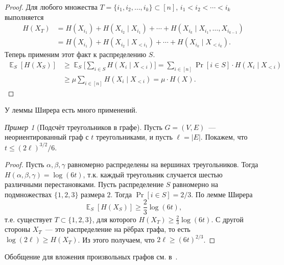 \documentclass[12pt]{article}
\newcommand{\seqn}[2]{{#1}_1,{#1}_2,\dotsc,{#1}_{#2}}
\DeclareMathOperator*{\E}{\mathbb{E}}
\theoremstyle{definition}
\theoremstyle{plain}
\theoremstyle{remark}
\newtheorem{example}{Пример}[section]
\begin{document}
\begin{proof}
	Для любого множества $T=\{\seqn{i}{k}\}\subset [n]$, 
	$i_1<i_2<\dotsb<i_k$ выполняется
	\begin{align*}
		H(X_T) 
		&= H(X_{i_1}) + H(X_{i_2}\mid X_{i_1}) + \dotsb + H(X_{i_k}\mid X_{i_1}, \dotsc, X_{i_{k-1}})\\
		&= H(X_{i_1}) + H(X_{i_2}\mid X_{<i_1}) + \dotsb + H(X_{i_k}\mid X_{<i_k}).
	\end{align*}
	Теперь применим этот факт к распределению $S$.
	\begin{align*}
		\E_S[H(X_S)] 
		&\ge \E_S\biggl[\sum_{i\in S} H(X_i\mid X_{<i})\biggr]
		 = \sum_{i\in[n]}\Pr[i\in S]\cdot H(X_i\mid X_{<i})\\
		&\ge \mu\sum_{i \in [n]} H(X_i\mid X_{<i}) = \mu\cdot H(X).
	\end{align*}
\end{proof}
У леммы Ширера есть много применений. 
\begin{example}[Подсчёт треугольников в графе]
	Пусть $G=(V,E)$~--- неориентированный граф с $t$ треугольниками, и пусть $\ell = |E|$. Покажем, что $t\le
	(2\ell)^{3/2} / 6$.
	\begin{proof}
		Пусть $\alpha,\beta,\gamma$ равномерно распределены на вершинах треугольников. Тогда $H(\alpha,\beta,\gamma) =
		\log(6t)$, т.к. каждый треугольник случается шестью различными перестановками. Пусть распределение $S$
		равномерно на подмножествах $\{1,2,3\}$ размера $2$. Тогда $\Pr[i\in S] = 2/3$. По лемме Ширера 
	\[
		\E_S[H(X_S)]\ge\frac23\log(6t),
	\]
	т.е. существует $T\subset \{1,2,3\}$, для которого $H(X_T)\ge \frac23 \log(6t)$.
	С другой стороны $X_T$~--- это распределение на рёбрах графа, то есть $\log(2\ell)\ge H(X_T)$. Из этого получаем,
	что $2\ell \ge (6t)^{2/3}$.
	\end{proof}
	Обобщение для вложения произвольных графов см. в~\cite{rao10}.
\end{example}
\end{document}
